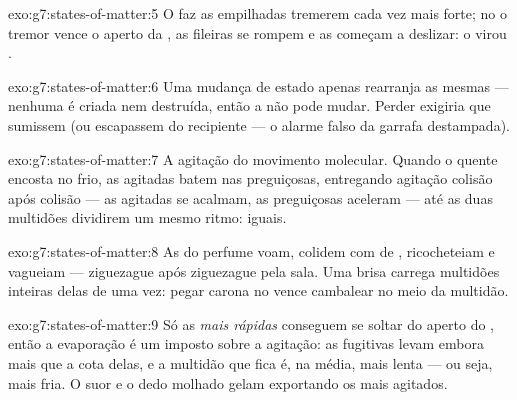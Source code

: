 \begin{solution}{exo:g7:states-of-matter:5}
O  faz as  empilhadas tremerem cada vez mais forte; no
 o tremor vence o aperto da , as fileiras se
rompem e as  começam a deslizar: o  virou .
\end{solution}

\begin{solution}{exo:g7:states-of-matter:6}
Uma mudança de estado apenas rearranja as mesmas  ---
nenhuma é criada nem destruída, então a  não pode mudar. Perder
 exigiria que  sumissem (ou escapassem do recipiente
--- o alarme falso da garrafa destampada).
\end{solution}

\begin{solution}{exo:g7:states-of-matter:7}
A agitação do movimento molecular. Quando o quente encosta no frio,
as  agitadas batem nas preguiçosas, entregando agitação
colisão após colisão --- as agitadas se acalmam, as preguiçosas
aceleram --- até as duas multidões dividirem um mesmo ritmo:
 iguais.
\end{solution}

\begin{solution}{exo:g7:states-of-matter:8}
As  do perfume voam, colidem com  de ,
ricocheteiam e vagueiam --- ziguezague após ziguezague pela sala. Uma
brisa carrega multidões inteiras delas de uma vez: pegar carona no
 vence cambalear no meio da multidão.
\end{solution}

\begin{solution}{exo:g7:states-of-matter:9}
Só as  \emph{mais rápidas} conseguem se soltar do aperto do
, então a evaporação é um imposto sobre a agitação: as
fugitivas levam embora mais que a cota delas, e a multidão que fica é,
na média, mais lenta --- ou seja, mais fria. O suor e o dedo molhado
gelam exportando os mais agitados.
\end{solution}

